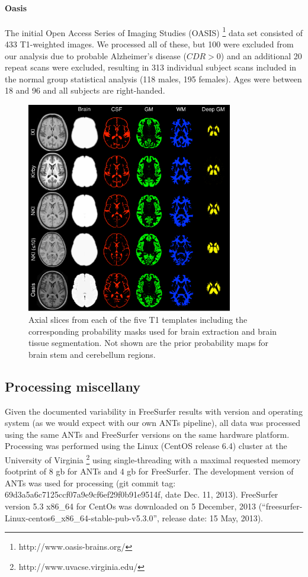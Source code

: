 \paragraph{Oasis}
The initial Open Access Series of Imaging Studies (OASIS)%
\footnote{
http://www.oasis-brains.org/
}
data set consisted of 433 T1-weighted images.  We processed all of these,
but 100 were excluded from our analysis due to probable Alzheimer's
disease ($CDR > 0$) and an additional 20 repeat scans were excluded,
 resulting in 313 individual subject scans included in the normal group statistical
analysis (118 males, 195 females).
Ages were between 18 and 96 and  
all subjects are right-handed.  


\begin{figure}
  \centering
  \includegraphics[width=90mm]{Figures/templateProbabilityMasks.pdf}
  \caption{Axial slices from each of the five T1 templates including the corresponding
  probability masks used for brain extraction and brain tissue segmentation.  Not shown
  are the prior probability maps for brain stem and cerebellum regions.
  }
  \label{fig:templateMasks}
\end{figure}


\subsection{Processing miscellany}

Given the documented variability in FreeSurfer results with version and
operating system \cite{gronenschild2012} (as we would expect with our own ANTs pipeline),
all data was processed using the same ANTs and FreeSurfer versions on the same 
hardware platform.  Processing was performed using the Linux (CentOS release 6.4) 
cluster at the University 
of Virginia%
\footnote{
http://www.uvacse.virginia.edu/
}
using single-threading with a maximal requested memory footprint of 8 gb for ANTs 
and 4 gb for FreeSurfer.  The development version of ANTs was used for processing 
(git commit tag: 69d3a5a6c7125ccf07a9e9cf6ef29f0b91e9514f, date Dec. 11, 2013).  
FreeSurfer version 5.3 x86\_64 for CentOs was downloaded 
on 5 December, 2013 (``freesurfer-Linux-centos6\_x86\_64-stable-pub-v5.3.0'', release
date: 15 May, 2013). 


